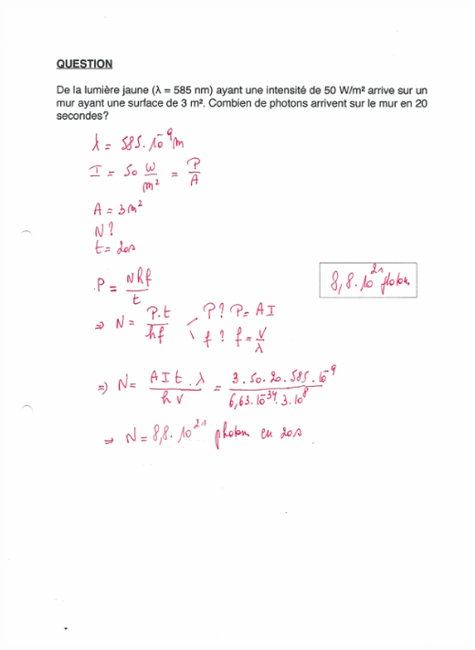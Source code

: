 {{{\includegraphics[width=17.498cm,height=24.13cm]{Pictures/10000001000002570000033B9D23F92FA4FE8FB5.png}

}}}
